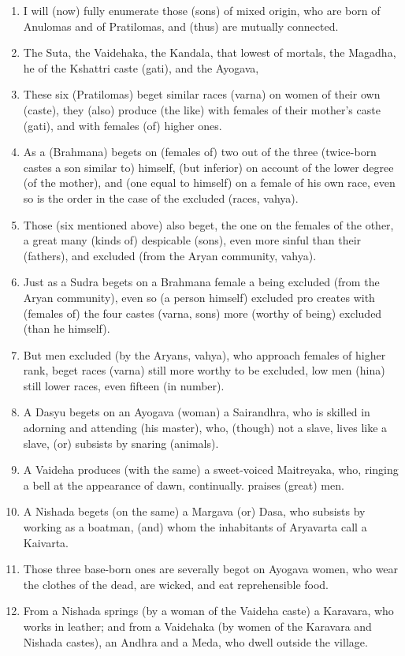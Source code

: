 \begin{enumerate}
\item I will (now) fully enumerate those (sons) of mixed origin, who are born of Anulomas and of Pratilomas, and (thus) are mutually connected.
\item The Suta, the Vaidehaka, the Kandala, that lowest of mortals, the Magadha, he of the Kshattri caste (gati), and the Ayogava,
\item These six (Pratilomas) beget similar races (varna) on women of their own (caste), they (also) produce (the like) with females of their mother's caste (gati), and with females (of) higher ones.
\item As a (Brahmana) begets on (females of) two out of the three (twice-born castes a son similar to) himself, (but inferior) on account of the lower degree (of the mother), and (one equal to himself) on a female of his own race, even so is the order in the case of the excluded (races, vahya).
\item Those (six mentioned above) also beget, the one on the females of the other, a great many (kinds of) despicable (sons), even more sinful than their (fathers), and excluded (from the Aryan community, vahya).
\item Just as a Sudra begets on a Brahmana female a being excluded (from the Aryan community), even so (a person himself) excluded pro creates with (females of) the four castes (varna, sons) more (worthy of being) excluded (than he himself).
\item But men excluded (by the Aryans, vahya), who approach females of higher rank, beget races (varna) still more worthy to be excluded, low men (hina) still lower races, even fifteen (in number).
\item A Dasyu begets on an Ayogava (woman) a Sairandhra, who is skilled in adorning and attending (his master), who, (though) not a slave, lives like a slave, (or) subsists by snaring (animals).
\item A Vaideha produces (with the same) a sweet-voiced Maitreyaka, who, ringing a bell at the appearance of dawn, continually. praises (great) men.
\item A Nishada begets (on the same) a Margava (or) Dasa, who subsists by working as a boatman, (and) whom the inhabitants of Aryavarta call a Kaivarta.
\item Those three base-born ones are severally begot on Ayogava women, who wear the clothes of the dead, are wicked, and eat reprehensible food.
\item From a Nishada springs (by a woman of the Vaideha caste) a Karavara, who works in leather; and from a Vaidehaka (by women of the Karavara and Nishada castes), an Andhra and a Meda, who dwell outside the village.

\end{enumerate}
